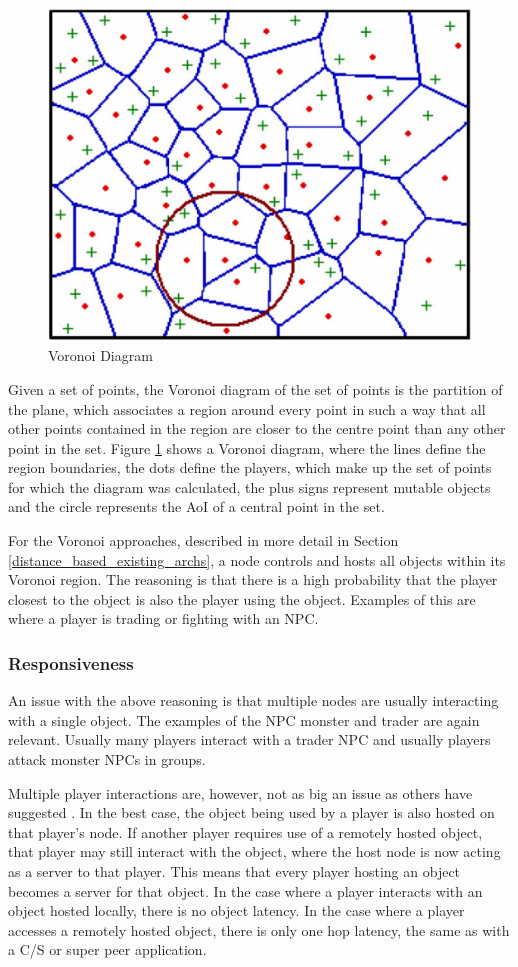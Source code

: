 \documentclass[10pt,a4paper,journal,cspaper,compsoc]{IEEEtran}
\begin{document}
\begin{figure}[htbp]
 \centering
 \includegraphics[width=0.7\columnwidth]{voronoi_diagram}
 \caption{Voronoi Diagram \cite{Buyukkaya_voronoi_state_management}}
 \label{fig_voronoi_diagram}
\end{figure}
%
Given a set of points, the Voronoi diagram of the set of points is the partition of the plane, which associates a region around every point in such a
way that all other points contained in the region are closer to the centre point than any other point in the set. Figure \ref{fig_voronoi_diagram}
shows a Voronoi diagram, where the lines define the region boundaries, the dots define the players, which make up the set of points for which the
diagram was calculated, the plus signs represent mutable objects and the circle represents the AoI of a central point in the set.

For the Voronoi approaches, described in more detail in Section \ref{distance_based_existing_archs}, a node controls and hosts all objects within its
Voronoi region. The reasoning is that there is a high probability that the player closest to the object is also the player using the object. Examples
of this are where a player is trading or fighting with an NPC.

\subsubsection{Responsiveness}

An issue with the above reasoning is that multiple nodes are usually interacting with a single object. The examples of the NPC monster and trader are
again relevant. Usually many players interact with a trader NPC and usually players attack monster NPCs in groups.

Multiple player interactions are, however, not as big an issue as others have suggested \cite{Fan_deisgn_issues_p2p}. In the best case, the object
being used by a player is also hosted on that player's node. If another player requires use of a remotely hosted object, that player may still
interact with the object, where the host node is now acting as a server to that player. This means that every player hosting an object becomes a
server for that object. In the case where a player interacts with an object hosted locally, there is no object latency. In the case where a player
accesses a remotely hosted object, there is only one hop latency, the same as with a C/S or super peer application.
\end{document}
